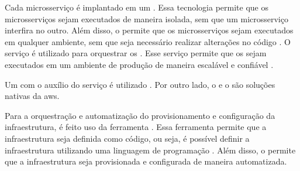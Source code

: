 Cada microsserviço é implantado em um  . Essa tecnologia permite que os microsserviços sejam executados de maneira isolada, sem que um microsserviço interfira no outro. Além disso, o  permite que os microsserviços sejam executados em qualquer ambiente, sem que seja necessário realizar alterações no código \cite{docker}. O serviço  é utilizado para orquestrar os  . Esse serviço permite que os  sejam executados em um ambiente de produção de maneira escalável e confiável \cite{amazonEcs}.

Um   com o auxílio do serviço  é utilizado \cite{postgreSql}. Por outro lado, o  e o  são soluções nativas da \acrshort{aws}.

Para a orquestração e automatização do provisionamento e configuração da infraestrutura, é feito uso da ferramenta . Essa ferramenta permite que a infraestrutura seja definida como código, ou seja, é possível definir a infraestrutura utilizando uma linguagem de programação \cite{terraform}. Além disso, o  permite que a infraestrutura seja provisionada e configurada de maneira automatizada.
